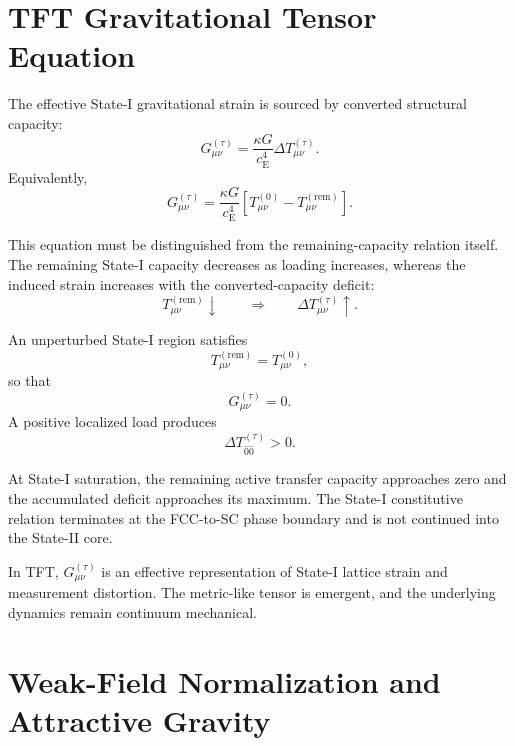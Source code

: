 \section{TFT Gravitational Tensor Equation}

The effective State-I gravitational strain is sourced by converted structural capacity:
\begin{equation}
    G_{\mu\nu}^{(\tau)} = \frac{\kappa G}{c_{\mathrm{E}}^4} \Delta T_{\mu\nu}^{(\tau)}.
\end{equation}
Equivalently,
\begin{equation}
    G_{\mu\nu}^{(\tau)} = \frac{\kappa G}{c_{\mathrm{E}}^4} \left[ T_{\mu\nu}^{(0)} - T_{\mu\nu}^{(\mathrm{rem})} \right].
\end{equation}

This equation must be distinguished from the remaining-capacity relation itself. The remaining State-I capacity decreases as loading increases, whereas the induced strain increases with the converted-capacity deficit:
\begin{equation}
    T_{\mu\nu}^{(\mathrm{rem})} \downarrow \qquad\Longrightarrow\qquad \Delta T_{\mu\nu}^{(\tau)} \uparrow.
\end{equation}

An unperturbed State-I region satisfies
\begin{equation}
    T_{\mu\nu}^{(\mathrm{rem})} = T_{\mu\nu}^{(0)},
\end{equation}
so that
\begin{equation}
    G_{\mu\nu}^{(\tau)}=0.
\end{equation}
A positive localized load produces
\begin{equation}
    \Delta T_{\hat{0}\hat{0}}^{(\tau)}>0.
\end{equation}

At State-I saturation, the remaining active transfer capacity approaches zero and the accumulated deficit approaches its maximum. The State-I constitutive relation terminates at the FCC-to-SC phase boundary and is not continued into the State-II core.

In TFT, $G_{\mu\nu}^{(\tau)}$ is an effective representation of State-I lattice strain and measurement distortion. The metric-like tensor is emergent, and the underlying dynamics remain continuum mechanical.

\section{Weak-Field Normalization and Attractive Gravity}

